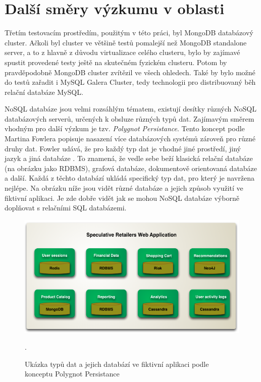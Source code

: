 \section{Další směry výzkumu v oblasti}
Třetím testovacím prostředím, použitým v této práci, byl MongoDB databázový cluster. Ačkoli byl cluster ve většině testů pomalejší než MongoDB standalone server, a to z hlavně z důvodu virtualizace celého clusteru, bylo by zajímavé spustit provedené testy ještě na skutečném fyzickém clusteru. Potom by pravděpodobně MongoDB cluster zvítězil ve všech ohledech. Také by bylo možné do testů zařadit i MySQL Galera Cluster, tedy technologii pro distribuovaný běh relační databáze MySQL.

NoSQL databáze jsou velmi rozsáhlým tématem, existují desítky různých NoSQL databázových serverů, určených k obsluze různých typů dat. Zajímavým směrem vhodným pro další výzkum je tzv. \emph{Polygnot Persistance}. Tento koncept podle Martina Fowlera popisuje nasazení více databázových systémů zároveň pro různé druhy dat. Fowler udává, že pro každý typ dat je vhodné jiné prostředí, jiný jazyk a jiná databáze \cite{fowlerpp}. To znamená, že vedle sebe beží klasická relační databáze (na obrázku jako RDBMS), grafová databáze, dokumentově orientovaná databáze a další. Každá z těchto databází ukládá specifický typ dat, pro který je navržena nejlépe. Na obrázku níže jsou vidět různé databáze a jejich způsob využití ve fiktivní aplikaci. Je zde dobře vidět jak se mohou NoSQL databáze výborně doplňovat s relačními SQL databázemi.
\begin{figure}[h]
\begin{centering}
\includegraphics[scale=0.45]{obrazky/polygnot-persistance}
\par\end{centering}
\caption{Ukázka typů dat a jejich databází ve fiktivní aplikaci podle konceptu Polygnot Persistance \cite{fowlerpp}}.
\end{figure}